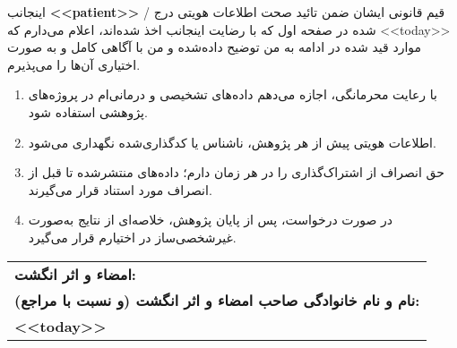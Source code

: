 \documentclass[12pt]{article}
\begin{document}
\vspace{2cm}

\large{}

\normalfont \normalsize
\begin{spacing}{1.2}
اینجانب
 \textbf{<<patient>>} \faSquare[regular] / قیم قانونی ایشان \faSquare[regular]
 ضمن تائید صحت اطلاعات هویتی درج شده در صفحه اول که با رضایت اینجانب اخذ شده‌اند، اعلام می‌دارم که 
 <<today>>
 موارد قید شده در ادامه به من توضیح داده‌شده و من با آگاهی کامل و به صورت اختیاری آن‌ها را می‌پذیرم.
 \end{spacing}

\begin{enumerate}
  \item با رعایت محرمانگی، اجازه می‌دهم داده‌های تشخیصی و درمانی‌ام در پروژه‌های پژوهشی استفاده شود.
  \item اطلاعات هویتی پیش از هر پژوهش، ناشناس یا کدگذاری‌شده نگهداری می‌شود.
  \item حق انصراف از اشتراک‌گذاری را در هر زمان دارم؛ داده‌های منتشرشده تا قبل از انصراف مورد استناد قرار می‌گیرند.
  \item در صورت درخواست، پس از پایان پژوهش، خلاصه‌ای از نتایج به‌صورت غیرشخصی‌ساز در اختیارم قرار می‌گیرد.
\end{enumerate}

\vspace{2cm}
\begin{tabularx}{\textwidth}{X}

  \textbf{امضاء و اثر انگشت:} \\
  \vspace{1cm}
  \textbf{نام و نام خانوادگی صاحب امضاء و اثر انگشت (و نسبت با مراجع): }\\
  \textbf{<<today>>}

\end{tabularx}
\end{document}
